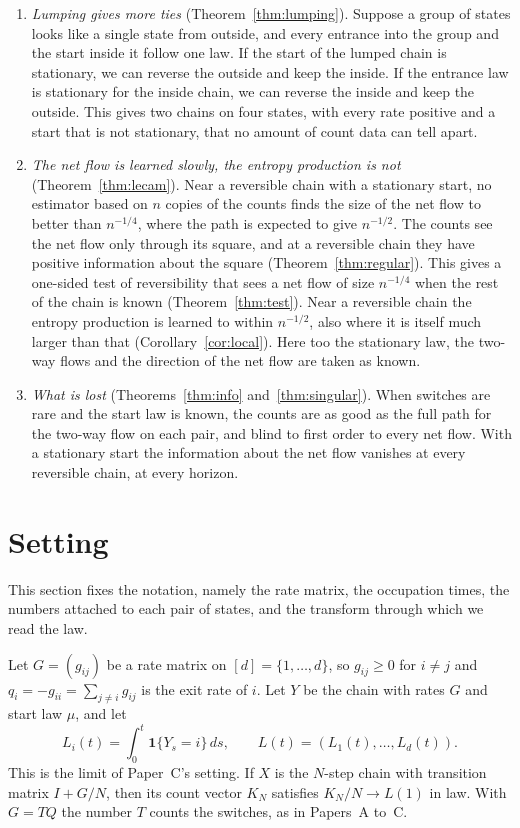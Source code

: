 \documentclass[11pt]{article}
\theoremstyle{definition}
\theoremstyle{remark}
\newcommand{\one}{\mathbf 1}
\begin{document}
\begin{enumerate}[1.,itemsep=2pt]
 are, namely the entropy production rate, and from any start they decide
 whether the chain is reversible (when every rate is positive).
\item \emph{Lumping gives more ties} (Theorem~\ref{thm:lumping}). Suppose a
 group of states looks like a single state from outside, and every entrance
 into the group and the start inside it follow one law. If the start of the
 lumped chain is stationary, we can reverse the outside and keep the inside. If
 the entrance law is stationary for the inside chain, we can reverse the
 inside and keep the outside. This gives two
 chains on four states, with every rate positive and a start that is not
 stationary, that no amount of count data can tell apart.
\item \emph{The net flow is learned slowly, the entropy production is not}
 (Theorem~\ref{thm:lecam}). Near a reversible chain with a stationary start, no
 estimator based on $n$ copies of the counts finds the size of the net flow to
 better than $n^{-1/4}$, where the path is expected to give $n^{-1/2}$. The counts see the net flow only through
 its square, and at a reversible chain they have positive information about
 the square (Theorem~\ref{thm:regular}). This gives a one-sided test of
 reversibility that sees a net flow of size $n^{-1/4}$ when the rest of the
 chain is known (Theorem~\ref{thm:test}). Near a reversible chain the
 entropy production is learned to within $n^{-1/2}$, also where it is itself
 much larger than that (Corollary~\ref{cor:local}). Here too the stationary
 law, the two-way flows and the direction of the net flow are taken as known.
\item \emph{What is lost} (Theorems~\ref{thm:info} and~\ref{thm:singular}). When
 switches are rare and the start law is known, the counts are as good as the
 full path for the two-way flow on each pair, and blind to first order to
 every net flow. With a stationary start
 the information about the net flow vanishes at every reversible chain, at
 every horizon.
\end{enumerate}

\section{Setting}

This section fixes the notation, namely the rate matrix, the occupation times,
the numbers attached to each pair of states, and the transform through which we
read the law.

Let $G=(g_{ij})$ be a rate matrix on $[d]=\{1,\ldots,d\}$, so $g_{ij}\ge0$ for
$i\ne j$ and $q_i=-g_{ii}=\sum_{j\ne i}g_{ij}$ is the exit rate of $i$. Let $Y$
be the chain with rates $G$ and start law $\mu$, and let
\[
L_i(t)=\int_0^t\one\{Y_s=i\}\,ds,\qquad L(t)=(L_1(t),\ldots,L_d(t)).
\]
This is the limit of Paper~C's setting. If $X$ is the $N$-step chain with
transition matrix $I+G/N$, then its count vector $K_N$ satisfies $K_N/N\to L(1)$
in law. With $G=TQ$ the number $T$ counts the switches, as in Papers~A to~C.
\end{document}
